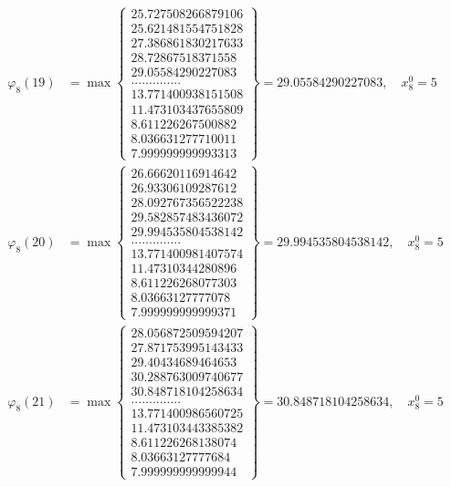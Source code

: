 \documentclass{article}
\begin{document}
\begin{align*}
  
  
  
\varphi_{8}(19) &= \max \left\{ \begin{array}{c}
25.727508266879106 \\
 25.621481554751828 \\
 27.386861830217633 \\
 28.72867518371558 \\
 29.05584290227083 \\
 .............. \\
 13.771400938151508 \\
 11.473103437655809 \\
 8.611226267500882 \\
 8.036631277710011 \\
 7.999999999993313
\end{array} \right\} = 29.05584290227083, \quad x_{8}^0 = 5\\
  
  
  
  
\varphi_{8}(20) &= \max \left\{ \begin{array}{c}
26.66620116914642 \\
 26.93306109287612 \\
 28.092767356522238 \\
 29.582857483436072 \\
 29.994535804538142 \\
 .............. \\
 13.771400981407574 \\
 11.47310344280896 \\
 8.611226268077303 \\
 8.03663127777078 \\
 7.999999999999371
\end{array} \right\} = 29.994535804538142, \quad x_{8}^0 = 5\\
  
  
  
  
\varphi_{8}(21) &= \max \left\{ \begin{array}{c}
28.056872509594207 \\
 27.871753995143433 \\
 29.40434689464653 \\
 30.288763009740677 \\
 30.848718104258634 \\
 .............. \\
 13.771400986560725 \\
 11.473103443385382 \\
 8.611226268138074 \\
 8.03663127777684 \\
 7.999999999999944
\end{array} \right\} = 30.848718104258634, \quad x_{8}^0 = 5\\
  

\end{align*}
\end{document}
